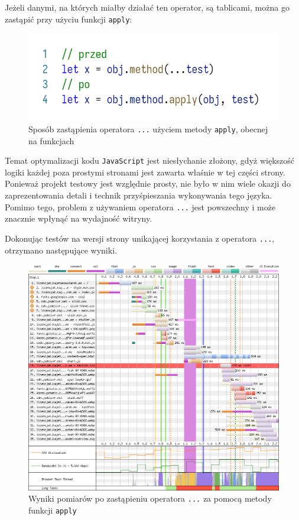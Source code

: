 \documentclass[licencjacka]{pracadypl}
\begin{document}
Jeżeli danymi, na których miałby działać ten operator, są tablicami, można go zastąpić przy użyciu funkcji \texttt{apply}:
\begin{figure}[H]
  \centering
  \includegraphics[width=\linewidth]{images/code-js-spread-operator.png}
  \caption{Sposób zastąpienia operatora \texttt{...} użyciem metody \texttt{apply}, obecnej na funkcjach}
  \label{fig:code-js-spread-operator}
\end{figure}

Temat optymalizacji kodu \texttt{JavaScript} jest niesłychanie złożony, gdyż większość logiki każdej poza prostymi stronami jest zawarta właśnie w tej części strony. Ponieważ projekt testowy jest względnie prosty, nie było w nim wiele okazji do zaprezentowania detali i technik przyśpieszania wykonywania tego języka. Pomimo tego, problem z używaniem operatora \texttt{...} jest powszechny i może znacznie wpłynąć na wydajność witryny.

Dokonując testów na wersji strony unikającej korzystania z operatora \texttt{...}, otrzymano następujące wyniki. 

\begin{figure}[H]
  \centering
  \includegraphics[width=\linewidth]{images/waterfall-after-no-array-spread.png}
  \caption{Wyniki pomiarów po zastąpieniu operatora \texttt{...} za pomocą metody funkcji \texttt{apply}}
  \label{fig:waterfall-after-no-array-spread}
\end{figure}
\end{document}

